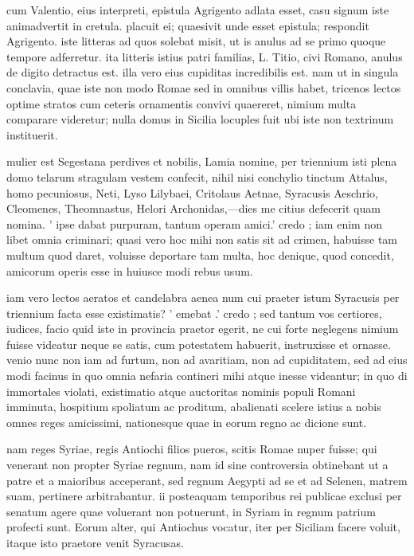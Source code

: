  cum Valentio, eius interpreti, epistula Agrigento adlata esset, casu signum iste animadvertit in cretula. placuit ei; quaesivit unde esset epistula; respondit Agrigento. iste litteras ad quos solebat misit, ut is anulus ad se primo quoque tempore adferretur. ita litteris istius patri familias, L. Titio, civi Romano, anulus de digito detractus est. illa vero eius cupiditas incredibilis est. nam ut in singula conclavia, quae iste non modo Romae sed in omnibus villis habet, tricenos lectos optime stratos cum ceteris ornamentis convivi quaereret, nimium multa comparare videretur; nulla domus in Sicilia locuples fuit ubi iste non textrinum instituerit.

 mulier est Segestana perdives et nobilis, Lamia nomine, per triennium isti plena domo telarum stragulam vestem confecit, nihil nisi conchylio tinctum Attalus, homo pecuniosus, Neti, Lyso Lilybaei, Critolaus Aetnae, Syracusis Aeschrio, Cleomenes, Theomnastus, Helori Archonidas,—dies me citius defecerit quam nomina. ' ipse dabat purpuram, tantum operam amici.' credo ; iam enim non libet omnia criminari; quasi vero hoc mihi non satis sit ad crimen, habuisse tam multum quod daret, voluisse deportare tam multa, hoc denique, quod concedit, amicorum operis esse in huiusce modi rebus usum.

 iam vero lectos aeratos et candelabra aenea num cui praeter istum Syracusis per triennium facta esse existimatis? ' emebat .' credo ; sed tantum vos certiores, iudices, facio quid iste in provincia praetor egerit, ne cui forte neglegens nimium fuisse videatur neque se satis, cum potestatem habuerit, instruxisse et ornasse. venio nunc non iam ad furtum, non ad avaritiam, non ad cupiditatem, sed ad eius modi facinus in quo omnia nefaria contineri mihi atque inesse videantur; in quo di immortales violati, existimatio atque auctoritas nominis populi Romani imminuta, hospitium spoliatum ac proditum, abalienati scelere istius a nobis omnes reges amicissimi, nationesque quae in eorum regno ac dicione sunt.

 nam reges Syriae, regis Antiochi filios pueros, scitis Romae nuper fuisse; qui venerant non propter Syriae regnum, nam id sine controversia obtinebant ut a patre et a maioribus acceperant, sed regnum Aegypti ad se et ad Selenen, matrem suam, pertinere arbitrabantur. ii posteaquam temporibus rei publicae exclusi per senatum agere quae voluerant non potuerunt, in Syriam in regnum patrium profecti sunt. Eorum alter, qui Antiochus vocatur, iter per Siciliam facere voluit, itaque isto praetore venit Syracusas.

